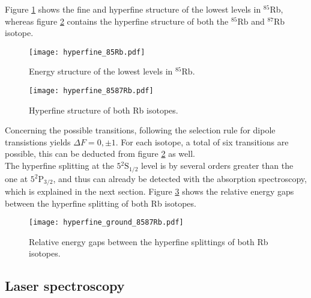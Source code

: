 Figure \ref{fig:hyperfine_85Rb} shows the fine and hyperfine structure of the lowest levels in $^{85}$Rb, whereas figure \ref{fig:hyperfine_8587Rb} contains the hyperfine structure of both the $^{85}\text{Rb}$ and $^{87}\text{Rb}$ isotope.
\begin{figure}[h]
	\centering
	\texttt{[image: hyperfine\_85Rb.pdf]}
	\caption{Energy structure of the lowest levels in $^{85}\text{Rb}$. \cite{lit:SAS}}
	\label{fig:hyperfine_85Rb}
\end{figure}
\begin{figure}[h]
	\centering
	\texttt{[image: hyperfine\_8587Rb.pdf]}
	\caption{Hyperfine structure of both Rb isotopes. \cite{lit:AK_manual2012}}
	\label{fig:hyperfine_8587Rb}
\end{figure}
Concerning the possible transitions, following the selection rule for dipole transistions yields $\Delta F=0,\pm 1$. For each isotope, a total of six transitions are possible, this can be deducted from figure \ref{fig:hyperfine_8587Rb} as well.\\
The hyperfine splitting at the $5{}^2\mathrm{S}_{1/2}$ level is by several orders greater than the one at $5{}^2\mathrm{P}_{3/2}$, and thus can already be detected with the absorption spectroscopy, which is explained in the next section. Figure \ref{fig:hyperfine_ground_8587Rb} shows the relative energy gaps between the hyperfine splitting of both Rb isotopes.
\begin{figure}[h]
	\centering
	\texttt{[image: hyperfine\_ground\_8587Rb.pdf]}
	\caption{Relative energy gaps between the hyperfine splittings of both Rb isotopes. \cite{lit:AK_manual2012}}
	\label{fig:hyperfine_ground_8587Rb}
\end{figure}
\subsection{Laser spectroscopy}

